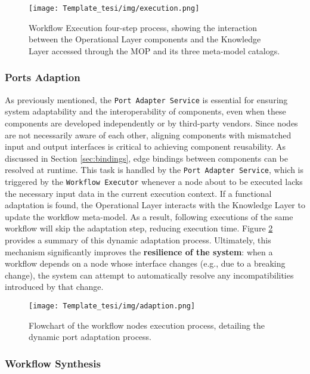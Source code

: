 \begin{figure}
  \centering
  \begin{adjustbox}{center}
    \texttt{[image: Template\_tesi/img/execution.png]}
  \end{adjustbox}
  \caption{Workflow Execution four-step process, showing the interaction between the Operational Layer components and the Knowledge Layer accessed through the MOP and its three meta-model catalogs.}
  \label{fig:exec}
\end{figure}


\subsubsection{Ports Adaption}

As previously mentioned, the \texttt{Port Adapter Service} is essential for ensuring system adaptability and the interoperability of components, even when these components are developed independently or by third-party vendors. Since nodes are not necessarily aware of each other, aligning components with mismatched input and output interfaces is critical to achieving component reusability.
As discussed in Section \ref{sec:bindings}, edge bindings between components can be resolved at runtime. This task is handled by the \texttt{Port Adapter Service}, which is triggered by the \texttt{Workflow Executor} whenever a node about to be executed lacks the necessary input data in the current execution context. If a functional adaptation is found, the Operational Layer interacts with the Knowledge Layer to update the workflow meta-model. As a result, following executions of the same workflow will skip the adaptation step, reducing execution time. Figure \ref{fig:adaption-flow-chart} provides a summary of this dynamic adaptation process.
Ultimately, this mechanism significantly improves the \textbf{resilience of the system}: when a workflow depends on a node whose interface changes (e.g., due to a breaking change), the system can attempt to automatically resolve any incompatibilities introduced by that change.

\begin{figure}[h]
    \centering
    \texttt{[image: Template\_tesi/img/adaption.png]}
    \caption{Flowchart of the workflow nodes execution process, detailing the dynamic port adaptation process.}
    \label{fig:adaption-flow-chart} 
\end{figure}


\subsubsection{Workflow Synthesis}


